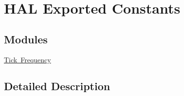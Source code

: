 \hypertarget{group___h_a_l___exported___constants}{}\section{H\+AL Exported Constants}
\label{group___h_a_l___exported___constants}
\subsection*{Modules}
\begin{DoxyCompactItemize}
\item 
\mbox{\hyperlink{group___h_a_l___t_i_c_k___f_r_e_q}{Tick Frequency}}
\end{DoxyCompactItemize}


\subsection{Detailed Description}
